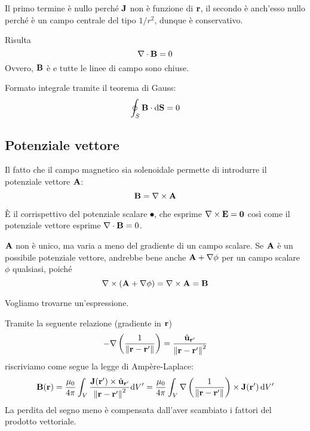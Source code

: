 Il primo termine è nullo perché $\mathbf{J}$ non è funzione di $\mathbf{r}$, il secondo è anch'esso nullo perché è un campo centrale del tipo $1/r^2$, dunque è conservativo.

Risulta
\begin{equation}
    \nabla \cdot \mathbf{B} = 0
\end{equation}
Ovvero, $\mathbf{B}$ è  e tutte le linee di campo sono chiuse.

Formato integrale tramite il teorema di Gauss:
\begin{equation}
    \oint_S \mathbf{B} \cdot \mathrm{d} \mathbf{S} = 0
\end{equation}

\subsection{Potenziale vettore}

Il fatto che il campo magnetico sia solenoidale permette di introdurre il potenziale vettore $\mathbf{A}$:
\begin{equation}
    \mathbf{B} = \nabla \times \mathbf{A}
\end{equation}

È il corrispettivo del potenziale scalare $\spot$, che esprime $\nabla \times \mathbf{E} = \mathbf{0}$ così come il potenziale vettore esprime $\nabla \cdot \mathbf{B} = 0$.

$\mathbf{A}$ non è unico, ma varia a meno del gradiente di un campo scalare.
Se $\mathbf{A}$ è un possibile potenziale vettore, andrebbe bene anche $\mathbf{A} + \nabla \phi$ per un campo scalare $\phi$ qualsiasi, poiché
\begin{equation}
    \nabla \times (\mathbf{A} + \nabla \phi) = \nabla \times \mathbf{A} = \mathbf{B}
\end{equation}

Vogliamo trovarne un'espressione.

Tramite la seguente relazione (gradiente in $\mathbf{r}$)
\begin{equation}
    - \nabla\left( \frac{1}{\left\lVert \mathbf{r} - \mathbf{r}' \right\rVert} \right) = \frac{\hat{\mathbf{u}}_{\mathbf{r}'}}{\left\lVert \mathbf{r} - \mathbf{r}' \right\rVert^2}
\end{equation}
riscriviamo come segue la legge di Ampère-Laplace:
\begin{equation}
    \mathbf{B}(\mathbf{r})
    = \frac{\mu_0}{4\pi} \int_V \frac{\mathbf{J}(\mathbf{r}') \times \hat{\mathbf{u}}_{\mathbf{r}'}}{\left\lVert \mathbf{r} - \mathbf{r}' \right\rVert^2} \mathrm{d} V'
    = \frac{\mu_0}{4\pi} \int_V \nabla\left( \frac{1}{\left\lVert \mathbf{r} - \mathbf{r}' \right\rVert} \right) \times \mathbf{J}(\mathbf{r}') \, \mathrm{d} V'
\end{equation}
La perdita del segno meno è compensata dall'aver scambiato i fattori del prodotto vettoriale.

